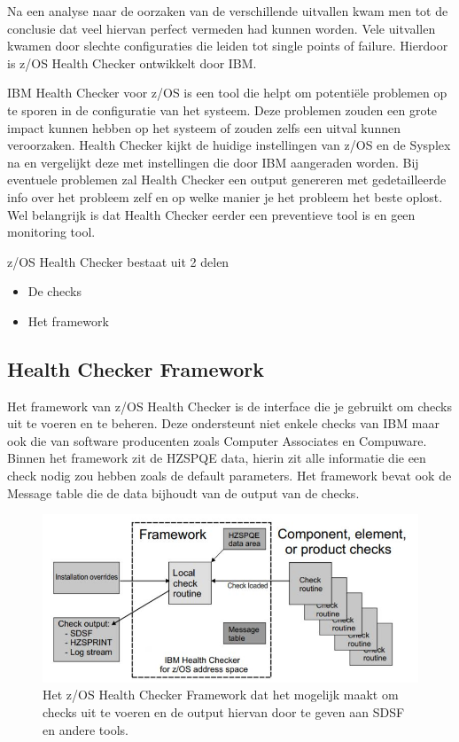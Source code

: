Na een analyse naar de oorzaken van de verschillende uitvallen kwam men tot de conclusie dat veel hiervan perfect vermeden had kunnen worden. Vele uitvallen kwamen door slechte configuraties die leiden tot single points of failure. Hierdoor is z/OS Health Checker ontwikkelt door IBM. \cite{Walle2013}

IBM Health Checker voor z/OS is een tool die helpt om potentiële problemen op te sporen in de configuratie van het systeem. Deze problemen zouden een grote impact kunnen hebben op het systeem of zouden zelfs een uitval kunnen veroorzaken. Health Checker kijkt de huidige instellingen van z/OS en de Sysplex na en vergelijkt deze met instellingen die door IBM aangeraden worden. Bij eventuele problemen zal Health Checker een output genereren met gedetailleerde info over het probleem zelf en op welke manier je het probleem het beste oplost. Wel belangrijk is dat Health Checker eerder een preventieve tool is en geen monitoring tool. \cite{Bezzi2010}

z/OS Health Checker bestaat uit 2 delen
\begin{itemize}
	\item De checks
	\item Het framework	
\end{itemize}

\subsection{Health Checker Framework}
\label{subsec:Health Checker Framework}

Het framework van z/OS Health Checker is de interface die je gebruikt om checks uit te voeren en te beheren. Deze ondersteunt niet enkele checks van IBM maar ook die van software producenten zoals Computer Associates en Compuware. Binnen het framework zit de HZSPQE data, hierin zit alle informatie die een check nodig zou hebben zoals de default parameters.  Het framework bevat ook de Message table die de data bijhoudt van de output van de checks. \cite{IBMCorporation2019}

\begin{figure}[h]
	\centering
	\includegraphics[width=0.7\linewidth]{img/HCFramework}
	\caption[z/OS Health Checker Framework]{Het z/OS Health Checker Framework dat het mogelijk maakt om checks uit te voeren en de output hiervan door te geven aan SDSF en andere tools.}
	\label{fig:hcframework}
\end{figure}


